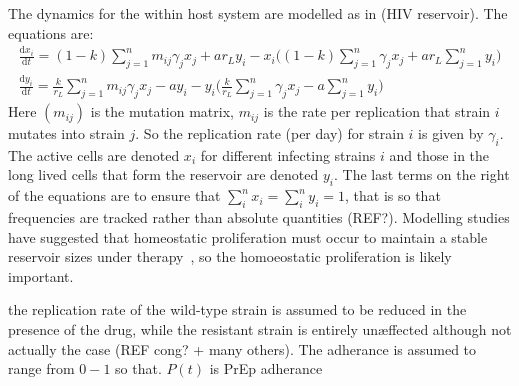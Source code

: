 \documentclass[DIV=15]{scrartcl}
\begin{document}
  The dynamics for the within host system  are modelled as in (HIV reservoir). The equations are:
 \begin{gather*}
\frac{\text{d} x_i}{\text{d} t} = (1-k) \sum_{j=1}^n m_{ij} \gamma_j x_j + a r_L y_i - x_i\bigg((1-k) \sum_{j=1}^n  \gamma_j x_j + ar_L \sum_{j=1}^n y_i \bigg)  \\
\frac{\text{d} y_i}{\text{d} t} = \frac{k}{r_L} \sum_{j=1}^n m_{ij} \gamma_j x_j - a y_i - y_i\bigg(\frac{k}{r_L} \sum_{j=1}^n  \gamma_j x_j - a \sum_{j=1}^n y_i \bigg) 
\end{gather*} 
Here $(m_{ij})$ is the mutation matrix, $m_{ij}$ is the rate per replication  that strain $i$ mutates into strain $j$. So the replication rate (per day)  for strain $i$ is given by $ \gamma_i$. The  active cells are denoted $ x_i$ for different infecting strains $i$  and those in the  long lived cells that form the reservoir are denoted $y_i$.  The last  terms on the right of the equations are to ensure that  $ \sum_i^n x_i = \sum_i^n y_i = 1$, that is so that frequencies are tracked rather than absolute quantities (REF?). Modelling studies have suggested that homeostatic proliferation must occur to maintain a stable reservoir sizes under therapy~\cite{kim2006,rong2009}, so the homoeostatic proliferation is likely important.







\iffalse
worst case for development of resistance is when virus is already present and people go onto PrPE (REF iprex etc) also  can model non-adherance by reducing average doing of the drug
\fi




\iffalse

 the replication rate of the wild-type strain is assumed to be reduced in the presence of the drug, while the resistant strain is entirely un{\ae}ffected although not actually the case (REF  cong? + many others). The adherance is assumed to range from $0-1$ so that. $P(t)$ is PrEp adherance 
\end{document}
